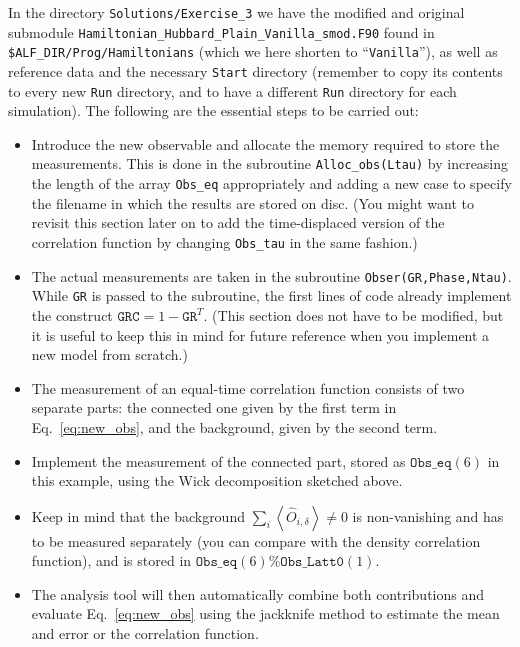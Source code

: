 \documentclass[10pt,modern]{scrartcl}
\numberwithin{exerciseitem}{exercise} %
\begin{document}
In the directory  \texttt{Solutions/Exercise\_3} we have the modified and original submodule \texttt{Hamiltonian\_Hubbard\_Plain\_Vanilla\_smod.F90} found in \texttt{\$ALF\_DIR/Prog/Hamiltonians} (which we here shorten to ``\texttt{Vanilla}''), as well as reference data and the necessary \texttt{Start} directory (remember to copy its contents to every new \texttt{Run} directory, and to have a different \texttt{Run} directory for each simulation). The following are the essential steps to be carried out:
\begin{itemize}
	\item  Introduce the new observable and allocate the memory required to store the measurements. This is done in the subroutine \texttt{Alloc\_obs(Ltau)} by increasing the length of the array \texttt{Obs\_eq} appropriately and adding a new case to specify the filename in which the results are stored on disc. (You might want to revisit this section later on to add the time-displaced version of the correlation function by changing \texttt{Obs\_tau} in the same fashion.)
	\item  The actual measurements are taken in the subroutine \texttt{Obser(GR,Phase,Ntau)}. While \texttt{GR} is passed to the subroutine, the first lines of code already implement the construct $\mathtt{GRC}=1-\mathtt{GR}^T$. (This section does not have to be modified, but it is useful to keep this in mind for future reference when you implement a new model from scratch.)
	\item The measurement of an equal-time correlation function consists of two separate parts: the connected one given by the first term in Eq.~\ref{eq:new_obs}, and the background, given by the second term.
	\item Implement the measurement of the connected part, stored as $\mathtt{Obs\_eq}(6)$ in this example, using the Wick decomposition sketched above.
	\item Keep in mind that the background $\sum_i\left\langle \hat{O}_{i,\delta} \right\rangle\neq0$ is non-vanishing and has to be measured separately (you can compare with the density correlation function), and is stored in $\mathtt{Obs\_eq}(6)\%\mathtt{Obs\_Latt0}(1)$.
	\item The analysis tool will then automatically combine both contributions and evaluate Eq.~\ref{eq:new_obs} using the jackknife method to estimate the mean and error or the correlation function.
\end{itemize}
\end{document}

